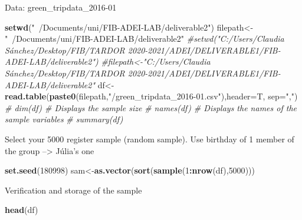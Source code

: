 \documentclass[
  18pt,
  a4paper]{article}
\newenvironment{Shaded}{\begin{snugshade}}{\end{snugshade}}
\newcommand{\CommentTok}[1]{\textcolor[rgb]{0.56,0.35,0.01}{\textit{#1}}}
\newcommand{\DataTypeTok}[1]{\textcolor[rgb]{0.13,0.29,0.53}{#1}}
\newcommand{\DecValTok}[1]{\textcolor[rgb]{0.00,0.00,0.81}{#1}}
\newcommand{\KeywordTok}[1]{\textcolor[rgb]{0.13,0.29,0.53}{\textbf{#1}}}
\newcommand{\NormalTok}[1]{#1}
\newcommand{\OperatorTok}[1]{\textcolor[rgb]{0.81,0.36,0.00}{\textbf{#1}}}
\newcommand{\StringTok}[1]{\textcolor[rgb]{0.31,0.60,0.02}{#1}}
\begin{document}
Data: green\_tripdata\_2016-01

\begin{Shaded}
\begin{Highlighting}[]
\KeywordTok{setwd}\NormalTok{(}\StringTok{"~/Documents/uni/FIB-ADEI-LAB/deliverable2"}\NormalTok{)}
\NormalTok{filepath<-}\StringTok{"~/Documents/uni/FIB-ADEI-LAB/deliverable2"}
\CommentTok{#setwd("C:/Users/Claudia Sánchez/Desktop/FIB/TARDOR 2020-2021/ADEI/DELIVERABLE1/FIB-ADEI-LAB/deliverable2")}
\CommentTok{#filepath<-"C:/Users/Claudia Sánchez/Desktop/FIB/TARDOR 2020-2021/ADEI/DELIVERABLE1/FIB-ADEI-LAB/deliverable2"}
\NormalTok{df<-}\KeywordTok{read.table}\NormalTok{(}\KeywordTok{paste0}\NormalTok{(filepath,}\StringTok{"/green_tripdata_2016-01.csv"}\NormalTok{),}\DataTypeTok{header=}\NormalTok{T, }\DataTypeTok{sep=}\StringTok{","}\NormalTok{)}
\CommentTok{# dim(df)       # Displays the sample size}
\CommentTok{# names(df)     # Displays the names of the sample variables}
\CommentTok{# summary(df)   }
\end{Highlighting}
\end{Shaded}

Select your 5000 register sample (random sample). Use birthday of 1
member of the group --\textgreater{} Júlia's one

\begin{Shaded}
\begin{Highlighting}[]
\KeywordTok{set.seed}\NormalTok{(}\DecValTok{180998}\NormalTok{)}
\NormalTok{sam<-}\KeywordTok{as.vector}\NormalTok{(}\KeywordTok{sort}\NormalTok{(}\KeywordTok{sample}\NormalTok{(}\DecValTok{1}\OperatorTok{:}\KeywordTok{nrow}\NormalTok{(df),}\DecValTok{5000}\NormalTok{)))}
\end{Highlighting}
\end{Shaded}

Verification and storage of the sample

\begin{Shaded}
\begin{Highlighting}[]
\KeywordTok{head}\NormalTok{(df)}
\end{Highlighting}
\end{Shaded}
\end{document}
